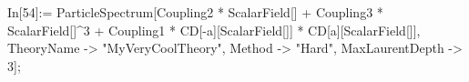 In[54]:= ParticleSpectrum[Coupling2 * ScalarField[] + Coupling3 * ScalarField[]^3 + Coupling1 * CD[-a][ScalarField[]] * CD[a][ScalarField[]], TheoryName -> "MyVeryCoolTheory", Method -> "Hard", MaxLaurentDepth -> 3]; 
